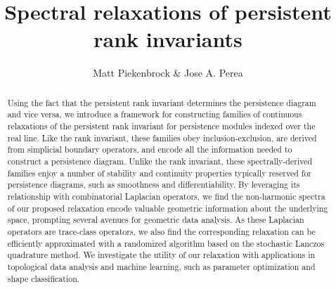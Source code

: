 \documentclass[10pt]{article}
\title{\vspace{-2.0em} 
Spectral relaxations of persistent rank invariants
\vspace{-0.5em}}
\author{Matt Piekenbrock \& Jose A. Perea}
\date{}
\numberwithin{equation}{section}
\newcommand{\+}{%
	\raisebox{0.18ex}{\scaleobj{0.55}{+}}
}
\theoremstyle{definition}
\theoremstyle{definition}
\begin{document}
\maketitle

\begin{abstract}
Using the fact that the persistent rank invariant determines the persistence diagram and vice versa, we introduce a framework for constructing families of continuous relaxations of the persistent rank invariant for persistence modules indexed over the real line. 
Like the rank invariant, these families obey inclusion-exclusion, are derived from simplicial boundary operators, and encode all the information needed to construct a persistence diagram. 
Unlike the rank invariant, these spectrally-derived families enjoy a number of stability and continuity properties typically reserved for persistence diagrams, such as smoothness and differentiability. 
By leveraging its relationship with combinatorial Laplacian operators, we find the non-harmonic spectra of our proposed relaxation encode valuable geometric information about the underlying space, prompting several avenues for geometric data analysis.
As these Laplacian operators are trace-class operators, we also find the corresponding relaxation can be efficiently approximated with a randomized algorithm based on the stochastic Lanczos quadrature method.
We investigate the utility of our relaxation with applications in topological data analysis and machine learning, such as parameter optimization and shape classification.

\end{abstract}
\end{document}
